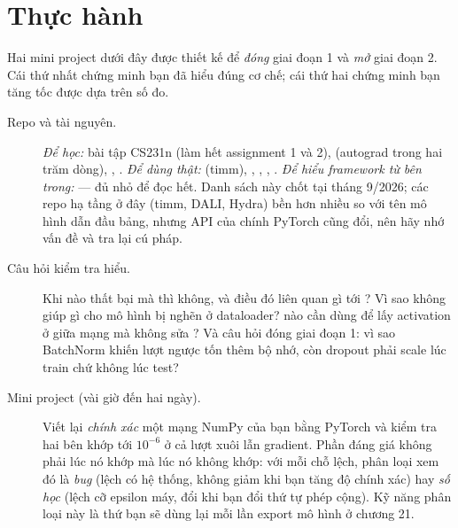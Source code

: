 \documentclass[../../deep_learning.tex]{subfiles}
\begin{document}




\section{Thực hành}
Hai mini project dưới đây được thiết kế để \emph{đóng} giai đoạn 1 và \emph{mở} giai đoạn 2. Cái thứ nhất chứng minh bạn đã hiểu đúng cơ chế; cái thứ hai chứng minh bạn tăng tốc được dựa trên số đo.

\begin{description}
\item[Repo và tài nguyên.] \emph{Để học:} bài tập CS231n (làm hết assignment 1 và 2),  (autograd trong hai trăm dòng), , . \emph{Để dùng thật:}  (timm), , , , . \emph{Để hiểu framework từ bên trong:}  --- đủ nhỏ để đọc hết. Danh sách này chốt tại tháng 9/2026; các repo hạ tầng ở đây (timm, DALI, Hydra) bền hơn nhiều so với tên mô hình dẫn đầu bảng, nhưng API của chính PyTorch cũng đổi, nên hãy nhớ vấn đề và tra lại cú pháp.

\item[Câu hỏi kiểm tra hiểu.] Khi nào  thất bại mà  thì không, và điều đó liên quan gì tới ? Vì sao  không giúp gì cho mô hình bị nghẽn ở dataloader?  nào cần dùng để lấy activation ở giữa mạng mà không sửa ? Và câu hỏi đóng giai đoạn 1: vì sao BatchNorm khiến lượt ngược tốn thêm bộ nhớ, còn dropout phải scale lúc train chứ không lúc test?

\item[Mini project (vài giờ đến hai ngày).] Viết lại \emph{chính xác} một mạng NumPy của bạn bằng PyTorch và kiểm tra hai bên khớp tới $10^{-6}$ ở cả lượt xuôi lẫn gradient. Phần đáng giá không phải lúc nó khớp mà lúc nó không khớp: với mỗi chỗ lệch, phân loại xem đó là \emph{bug} (lệch có hệ thống, không giảm khi bạn tăng độ chính xác) hay \emph{số học} (lệch cỡ epsilon máy, đổi khi bạn đổi thứ tự phép cộng). Kỹ năng phân loại này là thứ bạn sẽ dùng lại mỗi lần export mô hình ở chương 21.

\end{description}
\end{document}
